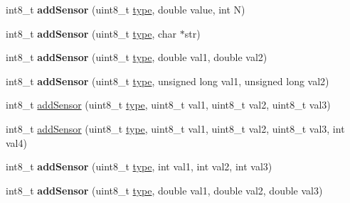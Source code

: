 \begin{DoxyCompactItemize}
\item 
int8\+\_\+t {\bfseries add\+Sensor} (uint8\+\_\+t \hyperlink{_sd_fat_structs_8h_a1d127017fb298b889f4ba24752d08b8e}{type}, double value, int N)\hypertarget{class_wasp_frame_ab35ae61a6e820ba4e6bf84b4bf1a2c03}{}\label{class_wasp_frame_ab35ae61a6e820ba4e6bf84b4bf1a2c03}

\item 
int8\+\_\+t {\bfseries add\+Sensor} (uint8\+\_\+t \hyperlink{_sd_fat_structs_8h_a1d127017fb298b889f4ba24752d08b8e}{type}, char $\ast$str)\hypertarget{class_wasp_frame_ad66a9af967b89148ce2b941db9f0fe35}{}\label{class_wasp_frame_ad66a9af967b89148ce2b941db9f0fe35}

\item 
int8\+\_\+t {\bfseries add\+Sensor} (uint8\+\_\+t \hyperlink{_sd_fat_structs_8h_a1d127017fb298b889f4ba24752d08b8e}{type}, double val1, double val2)\hypertarget{class_wasp_frame_aafd7f7dc8da714532ac36abd2e353b8e}{}\label{class_wasp_frame_aafd7f7dc8da714532ac36abd2e353b8e}

\item 
int8\+\_\+t {\bfseries add\+Sensor} (uint8\+\_\+t \hyperlink{_sd_fat_structs_8h_a1d127017fb298b889f4ba24752d08b8e}{type}, unsigned long val1, unsigned long val2)\hypertarget{class_wasp_frame_af2ac6f48ae6353c3b3444b1db96b23bb}{}\label{class_wasp_frame_af2ac6f48ae6353c3b3444b1db96b23bb}

\item 
int8\+\_\+t \hyperlink{class_wasp_frame_ad81626097aaa216960f51b917085dcee}{add\+Sensor} (uint8\+\_\+t \hyperlink{_sd_fat_structs_8h_a1d127017fb298b889f4ba24752d08b8e}{type}, uint8\+\_\+t val1, uint8\+\_\+t val2, uint8\+\_\+t val3)
\item 
int8\+\_\+t \hyperlink{class_wasp_frame_adf0963a7b3bee30545c50a43d830aaea}{add\+Sensor} (uint8\+\_\+t \hyperlink{_sd_fat_structs_8h_a1d127017fb298b889f4ba24752d08b8e}{type}, uint8\+\_\+t val1, uint8\+\_\+t val2, uint8\+\_\+t val3, int val4)
\item 
int8\+\_\+t {\bfseries add\+Sensor} (uint8\+\_\+t \hyperlink{_sd_fat_structs_8h_a1d127017fb298b889f4ba24752d08b8e}{type}, int val1, int val2, int val3)\hypertarget{class_wasp_frame_aa8cde1dd751ade0ba5cdfa7debb71bcc}{}\label{class_wasp_frame_aa8cde1dd751ade0ba5cdfa7debb71bcc}

\item 
int8\+\_\+t {\bfseries add\+Sensor} (uint8\+\_\+t \hyperlink{_sd_fat_structs_8h_a1d127017fb298b889f4ba24752d08b8e}{type}, double val1, double val2, double val3)\hypertarget{class_wasp_frame_a763cd50fa50bb9e11f27e3e089e31056}{}\label{class_wasp_frame_a763cd50fa50bb9e11f27e3e089e31056}


\end{DoxyCompactItemize}
